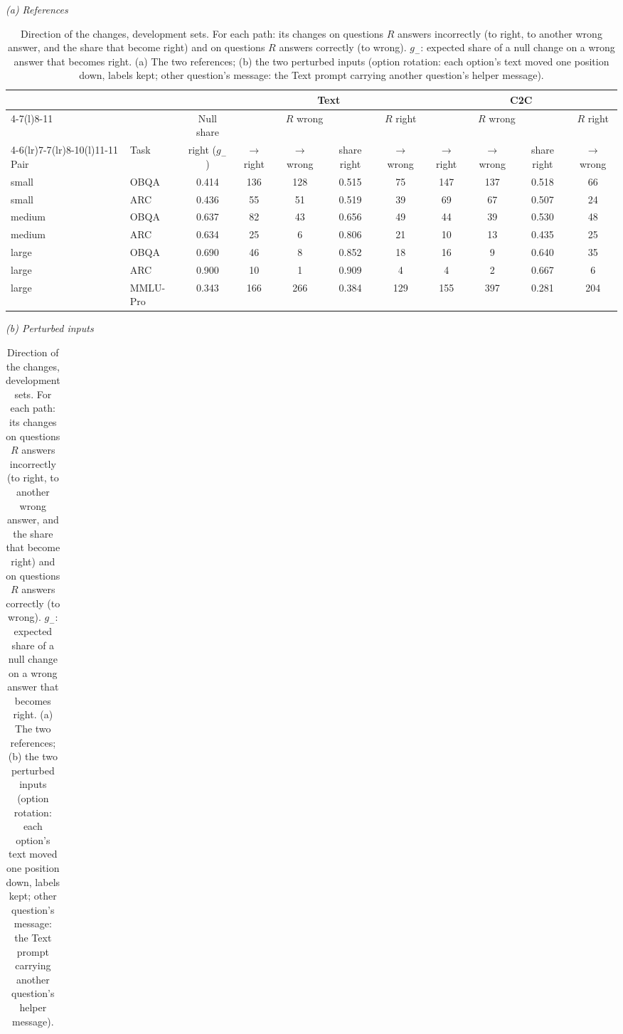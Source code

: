 \begin{table}[!htbp]\centering\scriptsize
\caption{Direction of the changes, development sets. For each path: its changes on questions $R$ answers incorrectly (to right, to another wrong answer, and the share that become right) and on questions $R$ answers correctly (to wrong). $g_-$: expected share of a null change on a wrong answer that becomes right. (a) The two references; (b) the two perturbed inputs (option rotation: each option's text moved one position down, labels kept; other question's message: the Text prompt carrying another question's helper message).}
\label{tab:e22dir}
\renewcommand{\arraystretch}{1.15}\setlength{\tabcolsep}{2.5pt}
\vspace{5pt}\textit{(a) References}\par\smallskip
\begin{tabular*}{\linewidth}{@{}ll@{\hspace{5pt}\extracolsep{\fill}}ccccccccc@{}}\toprule
& & & \multicolumn{4}{c}{Text} & \multicolumn{4}{c}{C2C}\\\cmidrule(lr){4-7}\cmidrule(l){8-11}
& & Null share & \multicolumn{3}{c}{$R$ wrong} & $R$ right & \multicolumn{3}{c}{$R$ wrong} & $R$ right\\\cmidrule(lr){4-6}\cmidrule(lr){7-7}\cmidrule(lr){8-10}\cmidrule(l){11-11}
Pair & Task & right ($g_-$) & $\to$right & $\to$wrong & share right & $\to$wrong & $\to$right & $\to$wrong & share right & $\to$wrong\\\midrule
small & OBQA & 0.414 & 136 & 128 & 0.515 & 75 & 147 & 137 & 0.518 & 66\\
small & ARC & 0.436 & 55 & 51 & 0.519 & 39 & 69 & 67 & 0.507 & 24\\
medium & OBQA & 0.637 & 82 & 43 & 0.656 & 49 & 44 & 39 & 0.530 & 48\\
medium & ARC & 0.634 & 25 & 6 & 0.806 & 21 & 10 & 13 & 0.435 & 25\\
large & OBQA & 0.690 & 46 & 8 & 0.852 & 18 & 16 & 9 & 0.640 & 35\\
large & ARC & 0.900 & 10 & 1 & 0.909 & 4 & 4 & 2 & 0.667 & 6\\
large & MMLU-Pro & 0.343 & 166 & 266 & 0.384 & 129 & 155 & 397 & 0.281 & 204\\\bottomrule
\end{tabular*}
\par\vspace{17pt}
\textit{(b) Perturbed inputs}\par\smallskip
\begin{tabular*}{\linewidth}{@{}ll@{\hspace{5pt}\extracolsep{\fill}}ccccccccc@{}}\toprule

\end{tabular*}
\end{table}
